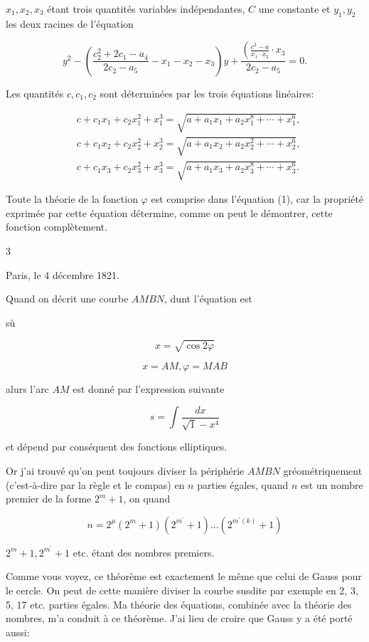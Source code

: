 \documentclass{article}
\begin{document}
\(x_{1}, x_{2}, x_{3}\) étant trois quantités variables indépendantes, \(C\) une constante et \(y_{1}, y_{2}\) les deux racines de l'équation

\[
y^{2}-\left(\frac{c_{2}^{2}+2 c_{1}-a_{4}}{2 c_{2}-a_{5}}-x_{1}-x_{2}-x_{3}\right) y+\frac{\left(\frac{c^{2}-a}{x_{1} \cdot x_{2}} \cdot x_{3}\right.}{2 c_{2}-a_{5}}=0 .
\]

Les quantités \(c, c_{1}, c_{2}\) sont déterminées par les trois équations linéaires:

\[
\begin{aligned}
& c+c_{1} x_{1}+c_{2} x_{1}^{2}+x_{1}^{3}=\sqrt{a+a_{1} x_{1}+a_{2} x_{1}^{8}+\cdots+x_{1}^{6}}, \\
& c+c_{1} x_{2}+c_{2} x_{2}^{2}+x_{2}^{3}=\sqrt{a+a_{1} x_{2}+a_{2} x_{2}^{2}+\cdots+x_{2}^{6}}, \\
& c+c_{1} x_{3}+c_{2} x_{3}^{2}+x_{3}^{3}=\sqrt{a+a_{1} x_{3}+a_{2} x_{3}^{8}+\cdots+x_{3}^{6}} .
\end{aligned}
\]

Toute la théorie de la fonction \(\varphi\) est comprise dans l'équation (1), car la propriété exprimée par cette équation détermine, comme on peut le démontrer, cette fonction complètement.

3

Paris, le 4 décembre 1821.

Quand on décrit une courbe \(A M B N\), dunt l'équation est

sù

\[
x=\sqrt{\cos 2 \varphi}
\]

\[
x=A M, \varphi=M A B
\]

alurs l'arc \(A M\) est donné par l'expression suivante

\[
s=\int \frac{d x}{\sqrt{1}-x^{4}}
\]

et dépend par conséquent des fonctions elliptiques.

Or j'ai trouvé qu'on pent toujours diviser la périphérie \(A M B N\) gréométriquement (c'est-à-dire par la règle et le compas) en \(n\) parties égales, quand \(n\) est un nombre premier de la forme \(2^{m}+1\), on quand

\[
n=2^{\mu}\left(2^{m}+1\right)\left(2^{m^{\prime}}+1\right) \ldots\left(2^{m^{\prime}(k)}+1\right)
\]

\(2^{m}+1,2^{m^{\prime}}+1\) etc. étant des nombres premiers.

Comme vous voyez, ce théorème est exactement le même que celui de Gauss pour le cercle. On peut de cette manière diviser la courbe susdite par exemple en 2, 3, 5, 17 etc. parties égales. Ma théorie des équations, combinée avec la théorie des nombres, m'a conduit à ce théorème. J'ai lieu de croire que Gauss y a été porté aussi:
\end{document}
